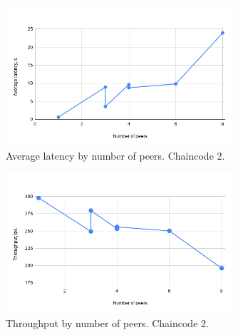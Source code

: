 \begin{figure}[H]
\begin{center}
\includegraphics[width=0.75\textwidth]{figures/avglat2}
\end{center}
\caption{Average latency by number of peers. Chaincode 2.}
\label{fig:avglat2}
\end{figure}

\begin{figure}[H]
\begin{center}
\includegraphics[width=0.75\textwidth]{figures/tps2}
\end{center}
\caption{Throughput by number of peers. Chaincode 2.}
\label{fig:tps2}
\end{figure}
